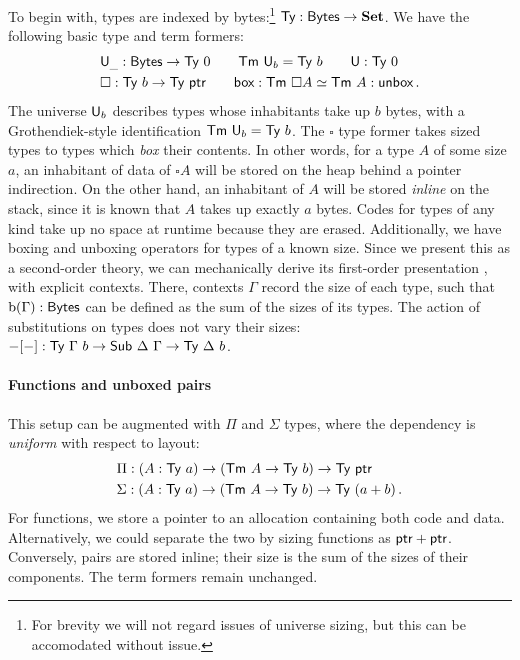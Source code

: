 To begin with, types are indexed by
bytes:\footnote{For brevity we will not regard issues of universe sizing, but this can
	be accomodated without issue.} $\textsf{Ty} : \textsf{Bytes} \to \textbf{Set}$.
We have the following basic type and term formers:
\begin{align*}
	 & \univ_{\_} : \Bytes \to \Ty\ 0\qquad \Tm\ \univ_b = \Ty\ b  \qquad  \univ : \Ty \ 0             \\
	 & \square : \Ty\ b \to \Ty\ \ptr\qquad \syn{box} : \Tm\ \square A \simeq \Tm\ A : \syn{unbox} \,.
\end{align*}
The universe \(\textsf{U}_b\) describes types whose inhabitants take up \(b\) bytes, with a Grothendiek-style
identification $\textsf{Tm}\ \textsf{U}_b = \textsf{Ty}\ b$. The \(\square\) type former takes sized types
to types which \emph{box} their contents. In other words, for a type $A$ of some
size $a$, an inhabitant of data of \(\square A\) will be stored on the heap
behind a pointer indirection. On the other hand, an inhabitant of \(A\) will be
stored \emph{inline} on the stack, since it is known that \(A\) takes up exactly
\(a\) bytes. Codes for types of any kind take up no space at runtime because
they are erased. Additionally, we have boxing and unboxing operators for types
of a known size. Since we present this as a second-order theory, we can mechanically derive
its first-order presentation \cite{Kaposi2024-db}, with explicit contexts. There, contexts $\Gamma$
record the size of each type, such that $\textrm{b}( \Gamma) : \textsf{Bytes}$ can be defined as
the sum of the sizes of its types. The action of substitutions on types does not
vary their sizes: $-[-] : \Ty\ \Gamma\ b \to \Sub\ \Delta\ \Gamma \to \Ty\
	\Delta\ b$.

\paragraph{Functions and unboxed pairs}\label{function-types}

This setup can be augmented with $\Pi$ and $\Sigma$ types, where the dependency
is \emph{uniform} with respect to layout:
\begin{align*}
	 & \Pi : (A : \Ty\ a) \to (\Tm\ A \to \Ty\ b) \to \Ty\ \ptr           \\
	 & \Sigma : (A : \Ty\ a) \to (\Tm\ A \to \Ty\ b) \to \Ty\ (a + b) \,.
\end{align*}
For functions, we store a pointer to an allocation containing both code and data.
Alternatively, we could separate the two by sizing functions as $\textsf{ptr} + \textsf{ptr}$.
Conversely, pairs are stored inline; their size is the sum of the sizes of their
components. The term formers remain unchanged.

